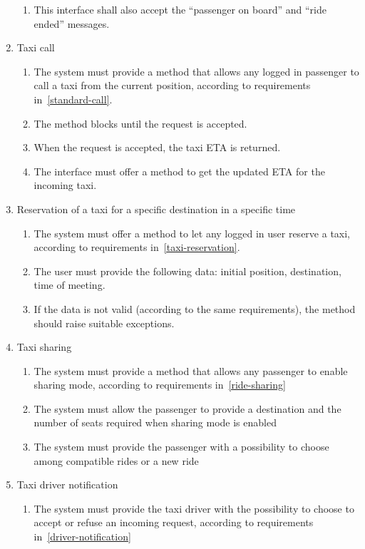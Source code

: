 \begin{enumerate}
\begin{enumerate}
    \item This interface shall also accept the ``passenger on board'' and ``ride ended'' messages.
\end{enumerate}
\item Taxi call
\begin{enumerate}
    \item The system must provide a method that allows any logged in passenger to call a taxi from the current position, according to requirements in~\autoref{standard-call}.
    \item The method blocks until the request is accepted.
    \item When the request is accepted, the taxi ETA is returned.
    \item The interface must offer a method to get the updated ETA for the incoming taxi.
\end{enumerate}

\item Reservation of a taxi for a specific destination in a specific time
\begin{enumerate}
    \item The system must offer a method to let any logged in user reserve a taxi, according to requirements in~\autoref{taxi-reservation}.
    \item The user must provide the following data: initial position, destination, time of meeting.
    \item If the data is not valid (according to the same requirements), the method should raise suitable exceptions.
\end{enumerate}

\item Taxi sharing
\begin{enumerate}
	\item The system must provide a method that allows any passenger to enable sharing mode, according to requirements in~\autoref{ride-sharing}
	\item The system must allow the passenger to provide a destination and the number of seats required when sharing mode is enabled
	\item The system must provide the passenger with a possibility to choose among compatible rides or a new ride
\end{enumerate}
\item Taxi driver notification
\begin{enumerate}
	\item The system must provide the taxi driver with the possibility to choose to accept or refuse an incoming request, according to requirements in~\autoref{driver-notification}
\end{enumerate}

\end{enumerate}

